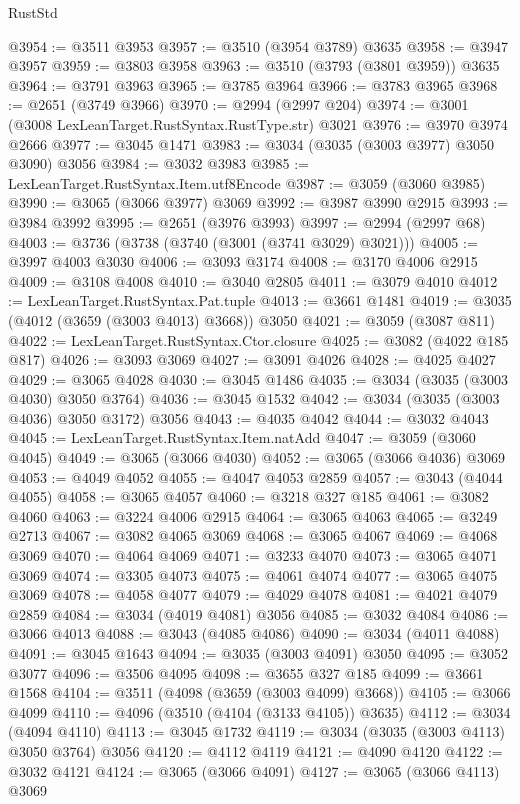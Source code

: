 \begin{lexlean}{RustStd}
\begin{coremodule}
@3954 := @3511 @3953
@3957 := @3510 (@3954 @3789) @3635
@3958 := @3947 @3957
@3959 := @3803 @3958
@3963 := @3510 (@3793 (@3801 @3959)) @3635
@3964 := @3791 @3963
@3965 := @3785 @3964
@3966 := @3783 @3965
@3968 := @2651 (@3749 @3966)
@3970 := @2994 (@2997 @204)
@3974 := @3001 (@3008 LexLeanTarget.RustSyntax.RustType.str) @3021
@3976 := @3970 @3974 @2666
@3977 := @3045 @1471
@3983 := @3034 (@3035 (@3003 @3977) @3050 @3090) @3056
@3984 := @3032 @3983
@3985 := LexLeanTarget.RustSyntax.Item.utf8Encode
@3987 := @3059 (@3060 @3985)
@3990 := @3065 (@3066 @3977) @3069
@3992 := @3987 @3990 @2915
@3993 := @3984 @3992
@3995 := @2651 (@3976 @3993)
@3997 := @2994 (@2997 @68)
@4003 := @3736 (@3738 (@3740 (@3001 (@3741 @3029) @3021)))
@4005 := @3997 @4003 @3030
@4006 := @3093 @3174
@4008 := @3170 @4006 @2915
@4009 := @3108 @4008
@4010 := @3040 @2805
@4011 := @3079 @4010
@4012 := LexLeanTarget.RustSyntax.Pat.tuple
@4013 := @3661 @1481
@4019 := @3035 (@4012 (@3659 (@3003 @4013) @3668)) @3050
@4021 := @3059 (@3087 @811)
@4022 := LexLeanTarget.RustSyntax.Ctor.closure
@4025 := @3082 (@4022 @185 @817)
@4026 := @3093 @3069
@4027 := @3091 @4026
@4028 := @4025 @4027
@4029 := @3065 @4028
@4030 := @3045 @1486
@4035 := @3034 (@3035 (@3003 @4030) @3050 @3764)
@4036 := @3045 @1532
@4042 := @3034 (@3035 (@3003 @4036) @3050 @3172) @3056
@4043 := @4035 @4042
@4044 := @3032 @4043
@4045 := LexLeanTarget.RustSyntax.Item.natAdd
@4047 := @3059 (@3060 @4045)
@4049 := @3065 (@3066 @4030)
@4052 := @3065 (@3066 @4036) @3069
@4053 := @4049 @4052
@4055 := @4047 @4053 @2859
@4057 := @3043 (@4044 @4055)
@4058 := @3065 @4057
@4060 := @3218 @327 @185
@4061 := @3082 @4060
@4063 := @3224 @4006 @2915
@4064 := @3065 @4063
@4065 := @3249 @2713
@4067 := @3082 @4065 @3069
@4068 := @3065 @4067
@4069 := @4068 @3069
@4070 := @4064 @4069
@4071 := @3233 @4070
@4073 := @3065 @4071 @3069
@4074 := @3305 @4073
@4075 := @4061 @4074
@4077 := @3065 @4075 @3069
@4078 := @4058 @4077
@4079 := @4029 @4078
@4081 := @4021 @4079 @2859
@4084 := @3034 (@4019 @4081) @3056
@4085 := @3032 @4084
@4086 := @3066 @4013
@4088 := @3043 (@4085 @4086)
@4090 := @3034 (@4011 @4088)
@4091 := @3045 @1643
@4094 := @3035 (@3003 @4091) @3050
@4095 := @3052 @3077
@4096 := @3506 @4095
@4098 := @3655 @327 @185
@4099 := @3661 @1568
@4104 := @3511 (@4098 (@3659 (@3003 @4099) @3668))
@4105 := @3066 @4099
@4110 := @4096 (@3510 (@4104 (@3133 @4105)) @3635)
@4112 := @3034 (@4094 @4110)
@4113 := @3045 @1732
@4119 := @3034 (@3035 (@3003 @4113) @3050 @3764) @3056
@4120 := @4112 @4119
@4121 := @4090 @4120
@4122 := @3032 @4121
@4124 := @3065 (@3066 @4091)
@4127 := @3065 (@3066 @4113) @3069

\end{coremodule}
\end{lexlean}
